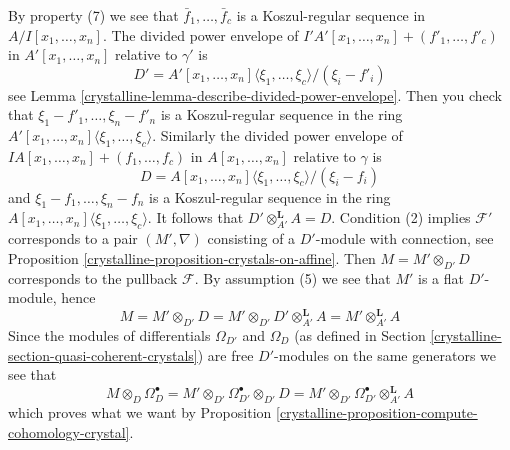 \begin{remark}
By property (7) we see that $\bar f_1, \ldots, \bar f_c$ is a Koszul-regular
sequence in $A/I[x_1, \ldots, x_n]$. The divided power envelope of
$I'A'[x_1, \ldots, x_n] + (f'_1, \ldots, f'_c)$ in $A'[x_1, \ldots, x_n]$
relative to $\gamma'$ is
$$
D' = A'[x_1, \ldots, x_n]\langle \xi_1, \ldots, \xi_c \rangle/(\xi_i - f'_i)
$$
see Lemma \ref{crystalline-lemma-describe-divided-power-envelope}. Then you check that
$\xi_1 - f'_1, \ldots, \xi_n - f'_n$ is a Koszul-regular sequence in the
ring $A'[x_1, \ldots, x_n]\langle \xi_1, \ldots, \xi_c\rangle$.
Similarly the divided power envelope of
$IA[x_1, \ldots, x_n] + (f_1, \ldots, f_c)$ in $A[x_1, \ldots, x_n]$
relative to $\gamma$ is
$$
D = A[x_1, \ldots, x_n]\langle \xi_1, \ldots, \xi_c\rangle/(\xi_i - f_i)
$$
and $\xi_1 - f_1, \ldots, \xi_n - f_n$ is a Koszul-regular sequence in the
ring $A[x_1, \ldots, x_n]\langle \xi_1, \ldots, \xi_c\rangle$.
It follows that $D' \otimes_{A'}^\mathbf{L} A = D$. Condition (2)
implies $\mathcal{F}'$ corresponds to a pair $(M', \nabla)$
consisting of a $D'$-module with connection, see
Proposition \ref{crystalline-proposition-crystals-on-affine}.
Then $M = M' \otimes_{D'} D$ corresponds to the pullback $\mathcal{F}$.
By assumption (5) we see that $M'$ is a flat $D'$-module, hence
$$
M = M' \otimes_{D'} D = M' \otimes_{D'} D' \otimes_{A'}^\mathbf{L} A
= M' \otimes_{A'}^\mathbf{L} A
$$
Since the modules of differentials $\Omega_{D'}$ and $\Omega_D$
(as defined in Section \ref{crystalline-section-quasi-coherent-crystals})
are free $D'$-modules on the same generators we see that
$$
M \otimes_D \Omega^\bullet_D =
M' \otimes_{D'} \Omega^\bullet_{D'} \otimes_{D'} D =
M' \otimes_{D'} \Omega^\bullet_{D'} \otimes_{A'}^\mathbf{L} A
$$
which proves what we want by
Proposition \ref{crystalline-proposition-compute-cohomology-crystal}.
\end{remark}

